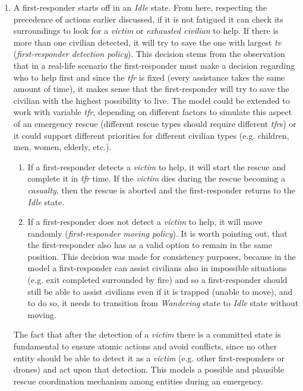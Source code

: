 \begin{enumerate}
	\item A first-responder starts off in an \textit{Idle} state. From here, respecting the precedence of actions earlier discussed, if it is not fatigued it can check its surroundings to look for a \textit{victim} or \textit{exhausted civilian} to help. If there is more than one civilian detected, it will try to save the one with largest \textit{tv} (\textit{first-responder detection policy}). This decision stems from the observation that in a real-life scenario the first-responder must make a decision regarding who to help first and since the \textit{tfr} is fixed (every assistance takes the same amount of time), it makes sense that the first-responder will try to save the civilian with the highest possibility to live. The model could be extended to work with variable \textit{tfr}, depending on different factors to simulate this aspect of an emergency rescue (different rescue types should require different \textit{tfr}s) or it could support different priorities for different civilian types (e.g. children, men, women, elderly, etc.).
	\begin{enumerate}
		\item If a first-responder detects a \textit{victim} to help, it will start the rescue and complete it in \textit{tfr} time. If the \textit{victim} dies during the rescue becoming a \textit{casualty}, then the rescue is aborted and the first-responder returns to the \textit{Idle} state.
		\item If a first-responder does not detect a \textit{victim} to help, it will move randomly (\textit{first-responder moving policy}). It is worth pointing out, that the first-responder also has as a valid option to remain in the same position. This decision was made for consistency purposes, because in the model a first-responder can assist civilians also in impossible situations (e.g. exit completed surrounded by fire) and so a first-responder should still be able to assist civilians even if it is trapped (unable to move), and to do so, it needs to transition from \textit{Wandering} state to \textit{Idle} state without moving.
	\end{enumerate}
	The fact that after the detection of a \textit{victim} there is a committed state is fundamental to ensure atomic actions and avoid conflicts, since no other entity should be able to detect it as a \textit{victim} (e.g. other first-responders or drones) and act upon that detection. This models a possible and plausible rescue coordination mechanism among entities during an emergency.\newline

\end{enumerate}
